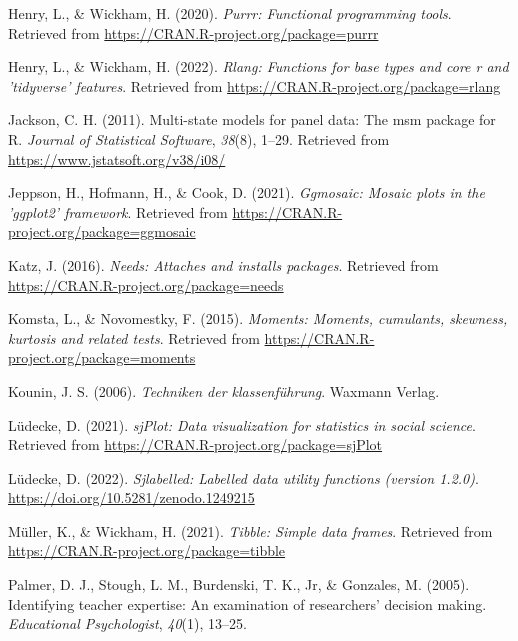 \documentclass[
  man]{apa6}
\newlength{\cslhangindent}
\newlength{\cslentryspacingunit} %
\newenvironment{CSLReferences}[2] %
 {%
  \setlength{\parindent}{0pt}
  \ifodd #1
  \let\oldpar\par
  \def\par{\hangindent=\cslhangindent\oldpar}
  \fi
  \setlength{\parskip}{#2\cslentryspacingunit}
 }%
 {}
\begin{document}
\begin{CSLReferences}{1}{0}
\leavevmode{}%
Henry, L., \& Wickham, H. (2020). \emph{Purrr: Functional programming tools}. Retrieved from \url{https://CRAN.R-project.org/package=purrr}

\leavevmode{}%
Henry, L., \& Wickham, H. (2022). \emph{Rlang: Functions for base types and core r and 'tidyverse' features}. Retrieved from \url{https://CRAN.R-project.org/package=rlang}

\leavevmode{}%
Jackson, C. H. (2011). Multi-state models for panel data: The {msm} package for {R}. \emph{Journal of Statistical Software}, \emph{38}(8), 1--29. Retrieved from \url{https://www.jstatsoft.org/v38/i08/}

\leavevmode{}%
Jeppson, H., Hofmann, H., \& Cook, D. (2021). \emph{Ggmosaic: Mosaic plots in the 'ggplot2' framework}. Retrieved from \url{https://CRAN.R-project.org/package=ggmosaic}

\leavevmode{}%
Katz, J. (2016). \emph{Needs: Attaches and installs packages}. Retrieved from \url{https://CRAN.R-project.org/package=needs}

\leavevmode{}%
Komsta, L., \& Novomestky, F. (2015). \emph{Moments: Moments, cumulants, skewness, kurtosis and related tests}. Retrieved from \url{https://CRAN.R-project.org/package=moments}

\leavevmode{}%
Kounin, J. S. (2006). \emph{Techniken der klassenf{ü}hrung}. Waxmann Verlag.

\leavevmode{}%
Lüdecke, D. (2021). \emph{sjPlot: Data visualization for statistics in social science}. Retrieved from \url{https://CRAN.R-project.org/package=sjPlot}

\leavevmode{}%
Lüdecke, D. (2022). \emph{Sjlabelled: Labelled data utility functions (version 1.2.0)}. \url{https://doi.org/10.5281/zenodo.1249215}

\leavevmode{}%
Müller, K., \& Wickham, H. (2021). \emph{Tibble: Simple data frames}. Retrieved from \url{https://CRAN.R-project.org/package=tibble}

\leavevmode{}%
Palmer, D. J., Stough, L. M., Burdenski, T. K., Jr, \& Gonzales, M. (2005). Identifying teacher expertise: An examination of researchers' decision making. \emph{Educational Psychologist}, \emph{40}(1), 13--25.


\end{CSLReferences}
\end{document}
